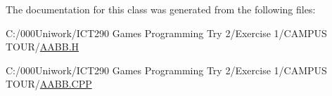 The documentation for this class was generated from the following files\+:\begin{DoxyCompactItemize}
\item 
C\+:/000\+Uniwork/\+I\+C\+T290 Games Programming Try 2/\+Exercise 1/\+C\+A\+M\+P\+U\+S T\+O\+U\+R/\hyperlink{_a_a_b_b_8_h}{A\+A\+B\+B.\+H}\item 
C\+:/000\+Uniwork/\+I\+C\+T290 Games Programming Try 2/\+Exercise 1/\+C\+A\+M\+P\+U\+S T\+O\+U\+R/\hyperlink{_a_a_b_b_8_c_p_p}{A\+A\+B\+B.\+C\+PP}\end{DoxyCompactItemize}
